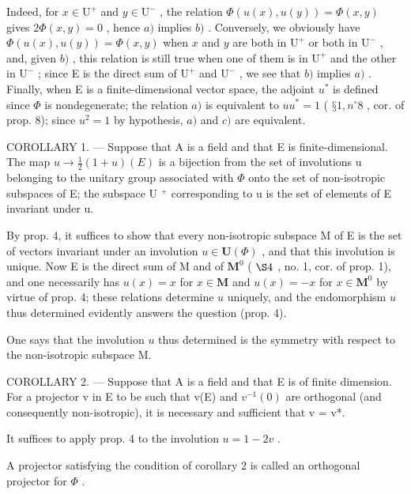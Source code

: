 Indeed, for \(x \in \mathrm{U}^{+}\) and \(y \in \mathrm{U}^{-}\) , the relation \(\Phi(u(x), u(y)) = \Phi(x, y)\) gives \(2\Phi(x, y) = 0\) , hence \(a)\) implies \(b)\) . Conversely, we obviously have \(\Phi(u(x), u(y)) = \Phi(x, y)\) when \(x\) and \(y\) are both in \(\mathrm{U}^{+}\) or both in \(\mathrm{U}^{-}\) , and, given \(b)\) , this relation is still true when one of them is in \(\mathrm{U}^{+}\) and the other in \(\mathrm{U}^{-}\) ; since E is the direct sum of \(\mathrm{U}^{+}\) and \(\mathrm{U}^{-}\) , we see that \(b)\) implies \(a)\) . Finally, when E is a finite-dimensional vector space, the adjoint \(u^{*}\) is defined since \(\Phi\) is nondegenerate; the relation \(a)\) is equivalent to \(uu^{*} = 1\) ( \(§ 1, n^{\circ} 8\) , cor. of prop. 8); since \(u^{2} = 1\) by hypothesis, \(a)\) and \(c)\) are equivalent.

COROLLARY 1. --- Suppose that A is a field and that E is finite-dimensional. The map \(u \to \frac{1}{2}(1 + u)(E)\) is a bijection from the set of involutions u belonging to the unitary group associated with \(\Phi\) onto the set of non-isotropic subspaces of E; the subspace U \(^+\) corresponding to u is the set of elements of E invariant under u.

By prop. 4, it suffices to show that every non-isotropic subspace M of E is the set of vectors invariant under an involution \(u \in \mathbf{U}(\Phi)\) , and that this involution is unique. Now E is the direct sum of M and of \(\mathbf{M}^0\) ( \(\S 4\) , no. 1, cor. of prop. 1), and one necessarily has \(u(x) = x\) for \(x \in \mathbf{M}\) and \(u(x) = -x\) for \(x \in \mathbf{M}^0\) by virtue of prop. 4; these relations determine \(u\) uniquely, and the endomorphism \(u\) thus determined evidently answers the question (prop. 4).

One says that the involution \(u\) thus determined is the symmetry with respect to the non-isotropic subspace M.

COROLLARY 2. --- Suppose that A is a field and that E is of finite dimension. For a projector v in E to be such that v(E) and \(v^{-1}(0)\) are orthogonal (and consequently non-isotropic), it is necessary and sufficient that v = v*.

It suffices to apply prop. 4 to the involution \(u = 1 - 2v\) .

A projector satisfying the condition of corollary 2 is called an orthogonal projector for \(\Phi\) .

